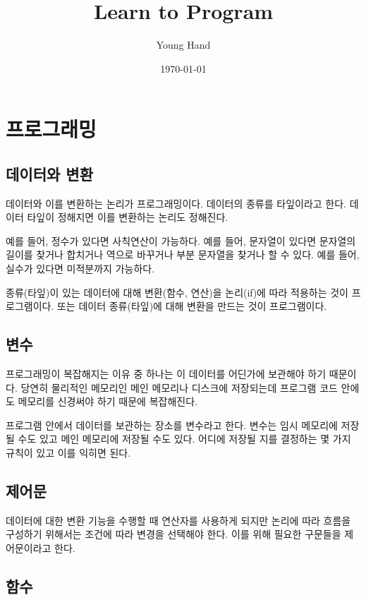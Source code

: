 \documentclass{article}
\theoremstyle{plain}
\theoremstyle{definition}
\theoremstyle{remark}
\begin{document}
\title{Learn to Program}
\author{Young Hand}
\date{\today}

\maketitle

\newpage
\tableofcontents
\newpage
{}


\section{프로그래밍}

\subsection{데이터와 변환}
데이터와 이를 변환하는 논리가 프로그래밍이다.
데이터의 종류를 타잎이라고 한다. 데이터 타잎이 정해지면 이를 변환하는 논리도 정해진다. 

예를 들어, 정수가 있다면 사칙연산이 가능하다. 
예를 들어, 문자열이 있다면 문자열의 길이를 찾거나 합치거나 역으로 바꾸거나 부분 문자열을 찾거나 할 수 있다. 
예를 들어, 실수가 있다면 미적분까지 가능하다. 

종류(타잎)이 있는 데이터에 대해 변환(함수, 연산)을 논리(if)에 따라 적용하는 것이 프로그램이다. 
또는 데이터 종류(타잎)에 대해 변환을 만드는 것이 프로그램이다. 

\subsection{변수}

프로그래밍이 복잡해지는 이유 중 하나는 이 데이터를 어딘가에 보관해야 하기 때문이다. 
당연히 물리적인 메모리인 메인 메모리나 디스크에 저장되는데 
프로그램 코드 안에도 메모리를 신경써야 하기 때문에 복잡해진다. 

프로그램 안에서 데이터를 보관하는 장소를 변수라고 한다. 
변수는 임시 메모리에 저장될 수도 있고 메인 메모리에 저장될 수도 있다. 
어디에 저장될 지를 결정하는 몇 가지 규칙이 있고 이를 익히면 된다. 

\subsection{제어문}

데이터에 대한 변환 기능을 수행할 때 연산자를 사용하게 되지만
논리에 따라 흐름을 구성하기 위해서는 조건에 따라 변경을 선택해야 한다. 
이를 위해 필요한 구문들을 제어문이라고 한다. 

\subsection{함수}
\end{document}

